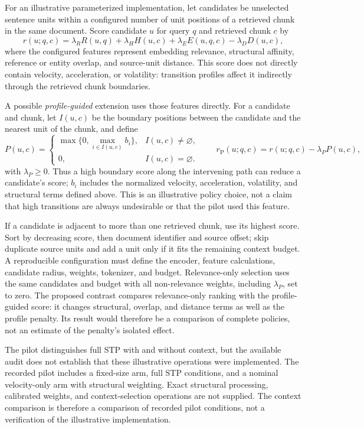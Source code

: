 \documentclass[10pt]{article}
\begin{document}
For an illustrative parameterized implementation, let candidates be unselected sentence units within a configured number of unit positions of a retrieved chunk in the same document. Score candidate $u$ for query $q$ and retrieved chunk $c$ by
\[
r(u;q,c)=\lambda_R R(u,q)+\lambda_H H(u,c)
          +\lambda_E E(u,q,c)-\lambda_D D(u,c),
\]
where the configured features represent embedding relevance, structural affinity, reference or entity overlap, and source-unit distance. This score does not directly contain velocity, acceleration, or volatility: transition profiles affect it indirectly through the retrieved chunk boundaries.

A possible \emph{profile-guided} extension uses those features directly. For a candidate and chunk, let $I(u,c)$ be the boundary positions between the candidate and the nearest unit of the chunk, and define
\[
P(u,c)=
\begin{cases}
\max\{0,\max_{i\in I(u,c)} b_i\}, & I(u,c)\ne\varnothing,\\
0, & I(u,c)=\varnothing.
\end{cases}
\qquad
r_{\mathrm{P}}(u;q,c)=r(u;q,c)-\lambda_P P(u,c),
\]
with $\lambda_P\geq 0$. Thus a high boundary score along the intervening path can reduce a candidate's score; $b_i$ includes the normalized velocity, acceleration, volatility, and structural terms defined above. This is an illustrative policy choice, not a claim that high transitions are always undesirable or that the pilot used this feature.

If a candidate is adjacent to more than one retrieved chunk, use its highest score. Sort by decreasing score, then document identifier and source offset; skip duplicate source units and add a unit only if it fits the remaining context budget. A reproducible configuration must define the encoder, feature calculations, candidate radius, weights, tokenizer, and budget. Relevance-only selection uses the same candidates and budget with all non-relevance weights, including $\lambda_P$, set to zero. The proposed contrast compares relevance-only ranking with the profile-guided score: it changes structural, overlap, and distance terms as well as the profile penalty. Its result would therefore be a comparison of complete policies, not an estimate of the penalty's isolated effect.

The pilot distinguishes full STP with and without context, but the available audit does not establish that these illustrative operations were implemented. The recorded pilot includes a fixed-size arm, full STP conditions, and a nominal velocity-only arm with structural weighting. Exact structural processing, calibrated weights, and context-selection operations are not supplied. The context comparison is therefore a comparison of recorded pilot conditions, not a verification of the illustrative implementation.
\end{document}
